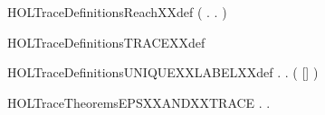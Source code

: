 \newcommand{\HOLTraceDefinitionsNODESXXdef}{\UseVerbatim{HOLTraceDefinitionsNODESXXdef}}
\begin{SaveVerbatim}{HOLTraceDefinitionsReachXXdef}
\HOLTokenTurnstile{}  \HOLSymConst{=} (\HOLTokenLambda{} . \HOLSymConst{\HOLTokenExists{}}.  \HOLTokenTransBegin{}\HOLTokenTransEnd {})\HOLSymConst{\HOLTokenSupStar{}}
\end{SaveVerbatim}
\newcommand{\HOLTraceDefinitionsReachXXdef}{\UseVerbatim{HOLTraceDefinitionsReachXXdef}}
\begin{SaveVerbatim}{HOLTraceDefinitionsTRACEXXdef}
\HOLTokenTurnstile{}  \HOLSymConst{=}  
\end{SaveVerbatim}
\newcommand{\HOLTraceDefinitionsTRACEXXdef}{\UseVerbatim{HOLTraceDefinitionsTRACEXXdef}}
\begin{SaveVerbatim}{HOLTraceDefinitionsUNIQUEXXLABELXXdef}
\HOLTokenTurnstile{} \HOLSymConst{\HOLTokenForall{}} .
          \HOLSymConst{\HOLTokenEquiv{}}
       \HOLSymConst{\HOLTokenExists{}} . ( \HOLSymConst{++} [] \HOLSymConst{++}  \HOLSymConst{=} ) \HOLSymConst{\HOLTokenConj{}}   \HOLSymConst{\HOLTokenConj{}}  
\end{SaveVerbatim}
\newcommand{\HOLTraceDefinitionsUNIQUEXXLABELXXdef}{\UseVerbatim{HOLTraceDefinitionsUNIQUEXXLABELXXdef}}
\newcommand{\HOLTraceDefinitions}{
\HOLDfnTag{Trace}{finite_state_def}\HOLTraceDefinitionsfiniteXXstateXXdef
\HOLDfnTag{Trace}{LRTC_DEF}\HOLTraceDefinitionsLRTCXXDEF
\HOLDfnTag{Trace}{NO_LABEL_def}\HOLTraceDefinitionsNOXXLABELXXdef
\HOLDfnTag{Trace}{NODES_def}\HOLTraceDefinitionsNODESXXdef
\HOLDfnTag{Trace}{Reach_def}\HOLTraceDefinitionsReachXXdef
\HOLDfnTag{Trace}{TRACE_def}\HOLTraceDefinitionsTRACEXXdef
\HOLDfnTag{Trace}{UNIQUE_LABEL_def}\HOLTraceDefinitionsUNIQUEXXLABELXXdef
}
\begin{SaveVerbatim}{HOLTraceTheoremsEPSXXANDXXTRACE}
\HOLTokenTurnstile{} \HOLSymConst{\HOLTokenForall{}} .    \HOLSymConst{\HOLTokenEquiv{}} \HOLSymConst{\HOLTokenExists{}}.     \HOLSymConst{\HOLTokenConj{}}  
\end{SaveVerbatim}
